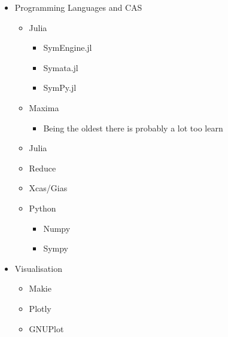 \documentclass[11pt]{article}
\begin{document}
\begin{itemize}
\item Programming Languages and CAS
\begin{itemize}
\item Julia
\begin{itemize}
\item SymEngine.jl
\item Symata.jl
\item SymPy.jl
\end{itemize}
\item Maxima
\begin{itemize}
\item Being the oldest there is probably a lot too learn
\end{itemize}
\item Julia
\item Reduce
\item Xcas/Gias
\item Python
\begin{itemize}
\item Numpy
\item Sympy
\end{itemize}
\end{itemize}
\item Visualisation
\begin{itemize}
\item Makie
\item Plotly
\item GNUPlot
\end{itemize}
\end{itemize}
\end{document}
